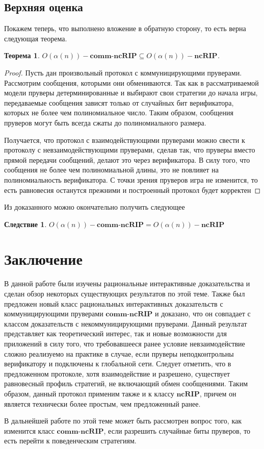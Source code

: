 \documentclass[14pt, a4paper]{extreport}
\newtheorem{theorem}{\indent Теорема}
\newtheorem{corollary}{\indent Следствие}
\begin{document}
            \section{Верхняя оценка}
            Покажем теперь, что выполнено вложение в обратную сторону, то есть верна следующая теорема.
            \begin{theorem}
                $O\left(\alpha(n)\right)-\textbf{comm-ncRIP} \subseteq O\left(\alpha(n)\right)-\textbf{ncRIP}$.
            \end{theorem}
            \begin{proof}
                Пусть дан произвольный протокол с коммуницирующими пруверами. Рассмотрим сообщения, которыми они обмениваются. Так как в рассматриваемой модели пруверы детерминированные и выбирают свои стратегии до начала игры, передаваемые сообщения зависят только от случайных бит верификатора, которых не более чем полиномиальное число. Таким образом, сообщения пруверов могут быть всегда сжаты до полиномиального размера.

                Получается, что протокол с взаимодействующими пруверами можно свести к протоколу с невзаимодействующими пруверами, сделав так, что пруверы вместо прямой передачи сообщений, делают это через верификатора. В силу того, что сообщения не более чем полиномиальной длины, это не повлияет на полиномиальность верификатора. С точки зрения пруверов игра не изменится, то есть равновесия останутся прежними и построенный протокол будет корректен
            \end{proof}
            Из доказанного можно окончательно получить следующее
            \begin{corollary}
                $O\left(\alpha(n)\right)-\textbf{comm-ncRIP} = O\left(\alpha(n)\right)-\textbf{ncRIP}$
            \end{corollary}
            \chapter*{Заключение}
            В данной работе были изучены рациональные интерактивные доказательства и сделан обзор некоторых существующих результатов по этой теме. Также был предложен новый класс рациональных интерактивных доказательств с коммуницирующими пруверами $\textbf{comm-ncRIP}$ и доказано, что он совпадает с классом доказательств с некоммуницирующими пруверами. Данный результат представляет как теоретический интерес, так и новые возможности для приложений в силу того, что требовавшееся ранее условие невзаимодействие сложно реализуемо на практике в случае, если пруверы неподконтрольны верификатору и подключены к глобальной сети. Следует отметить, что в предложенном протоколе, хотя взаимодействие и разрешено, существует равновесный профиль стратегий, не включающий обмен сообщениями. Таким образом, данный протокол применим также и к классу $\textbf{ncRIP}$, причем он является технически более простым, чем предложенный ранее.

            В дальнейшей работе по этой теме может быть рассмотрен вопрос того, как изменится класс $\textbf{comm-ncRIP}$, если разрешить случайные биты пруверов, то есть перейти к поведенческим стратегиям.
\newpage
\printbibliography
\end{document}
